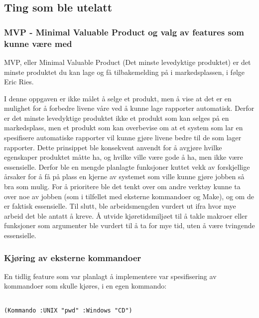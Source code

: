 \documentclass[11pt]{article}
\begin{document}
\subsection{Ting som ble utelatt}



\subsubsection{MVP - Minimal Valuable Product og valg av features som kunne være med}



MVP, eller Minimal Valuable Product (Det minste levedyktige produktet) er det minste produktet du kan lage og få tilbakemelding på i markedsplassen, i følge Eric Ries.



I denne oppgaven er ikke målet å selge et produkt, men å vise at det er en mulighet for å forbedre livene våre ved å kunne lage rapporter automatisk. Derfor er det minste levedyktige produktet ikke et produkt som kan selges på en markedsplass,
men et produkt som kan overbevise om at et system som lar en spesifisere automatiske rapporter vil kunne gjøre livene bedre til de som lager rapporter. Dette prinsippet ble konsekvent anvendt for å avgjøre hvilke egenskaper produktet måtte ha, og hvilke ville være gode å ha, men ikke være essensielle.
Derfor ble en mengde planlagte funksjoner kuttet vekk av forskjellige årsaker for å få på plass en kjerne av systemet som ville kunne gjøre jobben så bra som mulig. For å prioritere ble det tenkt over om andre verktøy kunne ta over noe av jobben (som i tilfellet med eksterne kommandoer og Make), og om de er faktisk essensielle. Til slutt, ble arbeidsmengden vurdert ut ifra hvor mye arbeid det ble antatt å kreve. Å utvide kjøretidsmiljøet til å takle makroer eller funksjoner som argumenter ble vurdert til å ta for mye tid, uten å være tvingende essensielle.



\subsubsection{Kjøring av eksterne kommandoer}



En tidlig feature som var planlagt å implementere var spesifisering av kommandoer som skulle kjøres, i en egen kommando:




\begin{lstlisting}

(Kommando :UNIX "pwd" :Windows "CD")
\end{lstlisting}
\end{document}
